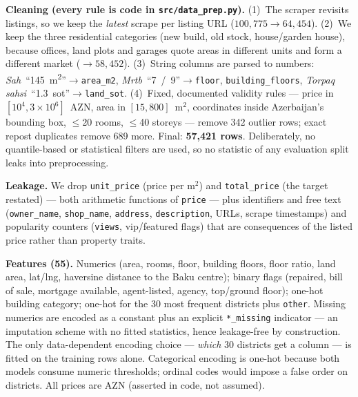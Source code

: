 \documentclass[10pt,twocolumn,a4paper]{article}
\newcommand{\az}[1]{\emph{#1}}
\begin{document}
\textbf{Cleaning (every rule is code in \texttt{src/data\_prep.py}).}
(1)~The scraper revisits listings, so we keep the \emph{latest} scrape per
listing URL ($100{,}775 \to 64{,}454$). (2)~We keep the three residential
categories (new build, old stock, house/garden house), because offices,
land plots and garages quote areas in different units and form a different
market ($\to 58{,}452$). (3)~String columns are parsed to numbers:
\az{Sah\textschwa}\ ``145~m\textsuperscript{2}''$\to$\texttt{area\_m2},
\az{M\textschwa rt\textschwa b\textschwa}\ ``7~/~9''$\to$\texttt{floor},
\texttt{building\_floors}, \az{Torpaq sah\textschwa si}\
``1.3~sot''$\to$\texttt{land\_sot}. (4)~Fixed, documented validity rules
--- price in $[10^4, 3{\times}10^6]$~AZN, area in $[15, 800]$~m$^2$,
coordinates inside Azerbaijan's bounding box, $\le$20 rooms, $\le$40
storeys --- remove 342 outlier rows; exact repost duplicates remove 689
more. Final: \textbf{57{,}421 rows}. Deliberately, no quantile-based or
statistical filters are used, so no statistic of any evaluation split
leaks into preprocessing.

\textbf{Leakage.} We drop \texttt{unit\_price} (price per m$^2$) and
\texttt{total\_price} (the target restated) --- both arithmetic functions
of \texttt{price} --- plus identifiers and free text
(\texttt{owner\_name}, \texttt{shop\_name}, \texttt{address},
\texttt{description}, URLs, scrape timestamps) and popularity counters
(\texttt{views}, vip/featured flags) that are consequences of the listed
price rather than property traits.

\textbf{Features (55).} Numerics (area, rooms, floor, building floors,
floor ratio, land area, lat/lng, haversine distance to the Baku centre);
binary flags (repaired, bill of sale, mortgage available, agent-listed,
agency, top/ground floor); one-hot building category; one-hot for the 30
most frequent districts plus \texttt{other}. Missing numerics are encoded
as a constant plus an explicit \texttt{*\_missing} indicator --- an
imputation scheme with no fitted statistics, hence leakage-free by
construction. The only data-dependent encoding choice --- \emph{which} 30
districts get a column --- is fitted on the training rows alone.
Categorical encoding is one-hot because both models consume numeric
thresholds; ordinal codes would impose a false order on districts. All
prices are AZN (asserted in code, not assumed).
\end{document}
